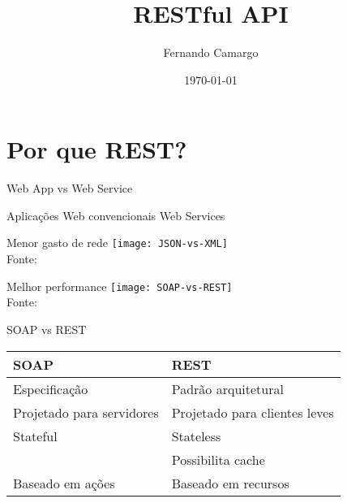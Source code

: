 \documentclass{beamer}
\title{RESTful API}
\date{\today}
\author{Fernando Camargo}
\institute{ZG Soluções}
\begin{document}
\maketitle

\section{Por que REST?}

\begin{frame}{Web App vs Web Service}
  \begin{outline}
     Aplicações Web convencionais
  \0 \visible<1->{\resizebox{!}{1in}{}}
     Web Services
  \0 
  \end{outline}
\end{frame}

\begin{frame}{Menor gasto de rede}
  \texttt{[image: JSON-vs-XML]}\\
  {\tiny Fonte: \cite{davelaar2015}}
\end{frame}

\begin{frame}{Melhor performance}
  \texttt{[image: SOAP-vs-REST]}\\
  {\tiny Fonte: \cite{davelaar2015}}
\end{frame}


\begin{frame}{SOAP vs REST}
  \begin{table}[]
    \begin{tabular}{@{}ll@{}}
      \toprule
      \textbf{SOAP}                       & \textbf{REST}                           \\ \midrule
      Especificação                       & Padrão arquitetural                     \\ \pause
      Projetado para \alert{servidores}   & Projetado para \alert{clientes leves}   \\ \pause
      Stateful                            & Stateless                               \\ \pause
					  & Possibilita cache                       \\ \pause
      Baseado em ações                    & Baseado em recursos                     \\ \bottomrule
    \end{tabular}
  \end{table}
\end{frame}
\end{document}

